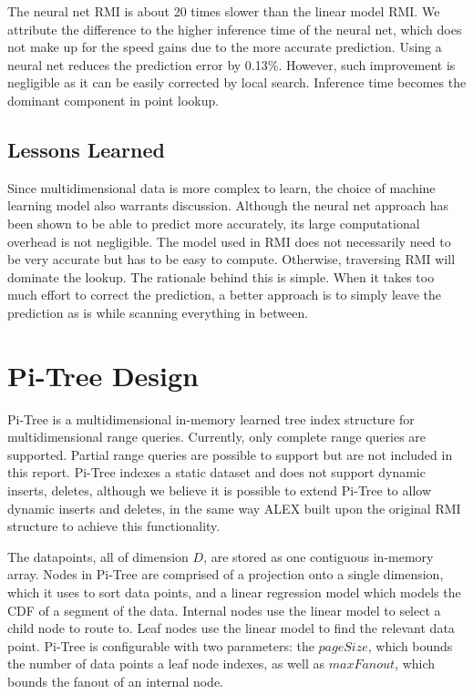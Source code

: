 \documentclass[sigconf,10pt]{acmart}
\begin{document}
The neural net RMI is about 20 times slower than the linear model RMI.
We attribute the difference to the higher inference time of the neural net, which does not make up for
the speed gains due to the more accurate prediction. Using a neural net reduces the prediction
error by 0.13\%. However,
such improvement is negligible as it can be easily corrected by local search. 
Inference time becomes the dominant component in point lookup.

\subsection{Lessons Learned}

Since multidimensional data is more complex to learn, the choice of machine learning model also
warrants discussion. Although the neural net approach has been shown to be able to predict more accurately, its
large computational overhead is not negligible. The model used in RMI does not necessarily need to
be very accurate but has to be easy to compute. Otherwise, traversing RMI will dominate the lookup.
The rationale behind this is simple. When it takes too much effort to correct the prediction, a better
approach is to simply leave the prediction as is while scanning everything in between. 

\section{Pi-Tree Design}

Pi-Tree is a multidimensional in-memory learned tree index structure for
multidimensional range queries. Currently, only complete range queries are supported.
Partial range queries are possible to support but are not included in this report. 
Pi-Tree indexes a static dataset and does not support dynamic inserts, deletes,
although we believe it is possible to extend Pi-Tree to allow dynamic inserts and deletes,
in the same way ALEX built upon the original RMI structure to achieve this functionality. %

The datapoints, all of dimension $D$, are stored as one contiguous in-memory array.
Nodes in Pi-Tree are comprised of a projection onto a single dimension, which it uses to
sort data points, and a linear regression model which models the CDF of a segment of the data.
Internal nodes use the linear model to select a child node to route to.
Leaf nodes use the linear model to find the relevant data point. 
Pi-Tree is configurable with two parameters: the $pageSize$, 
which bounds the number of data points
a leaf node indexes, as well as $maxFanout$, which bounds the fanout
of an internal node.
\end{document}
